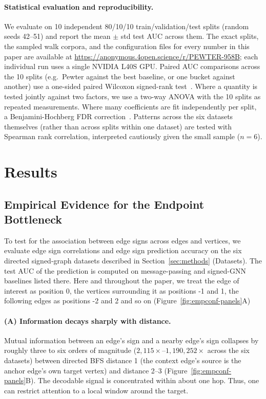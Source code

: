 \documentclass[sigconf, review, anonymous]{acmart}
\theoremstyle{plain}
\theoremstyle{definition}
\begin{document}
\paragraph{Statistical evaluation and reproducibility.} We evaluate on 10 independent 80/10/10 train/validation/test splits (random seeds 42--51) and report the mean $\pm$ std test AUC across them. The exact splits, the sampled walk corpora, and the configuration files for every number in this paper are available at \url{https://anonymous.4open.science/r/PEWTER-958B}; each individual run uses a single NVIDIA L40S GPU. Paired AUC comparisons across the 10 splits (e.g.\ Pewter against the best baseline, or one bucket against another) use a one-sided paired Wilcoxon signed-rank test~\citep{wilcoxon1945individual}. Where a quantity is tested jointly against two factors, we use a two-way ANOVA with the 10 splits as repeated measurements.  Where many coefficients are fit independently per split, a Benjamini-Hochberg FDR correction~\citep{benjamini1995controlling}. Patterns across the six datasets themselves (rather than across splits within one dataset) are tested with Spearman rank correlation, interpreted cautiously given the small sample ($n=6$).
\section{Results}

\subsection{Empirical Evidence for the Endpoint Bottleneck}
\label{sec:empconf}
To test for the association between edge signs across edges and vertices,  we evaluate edge sign correlations and edge sign prediction accuracy on the six directed signed-graph datasets described in Section~\ref{sec:methods} (Datasets). The test AUC of the prediction is computed on message-passing and signed-GNN baselines listed there. Here and throughout the paper, we treat the edge of interest as position 0, the vertices surrounding it as positions -1 and 1, the following edges as positions -2 and 2 and so on (Figure~\ref{fig:empconf-panels}A)

\paragraph{(A) Information decays sharply with distance.}
Mutual information between an edge's sign and a nearby edge's sign collapses by roughly three to six orders of magnitude ($2{,}115\times$--$1{,}190{,}252\times$ across the six datasets) between directed BFS distance 1 (the context edge's source is the anchor edge's own target vertex) and distance 2--3 (Figure~\ref{fig:empconf-panels}B). The decodable signal is concentrated within about one hop. Thus, one can restrict attention to a local window around the target.
\end{document}
